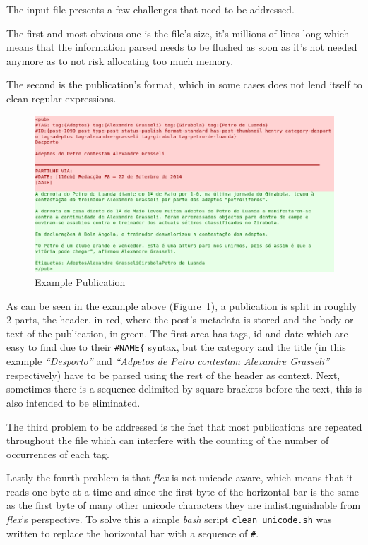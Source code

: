 \documentclass[a4paper]{article}
\begin{document}
The input file presents a few challenges that need to be addressed.

The first and most obvious one is the file's size, it's millions of lines long
which means that the information parsed needs to be flushed as soon as it's not
needed anymore as to not risk allocating too much memory.

The second is the publication's format, which in some cases does not lend
itself to clean regular expressions.

\begin{figure}[H]
    \includegraphics[width=\textwidth]{./example_pub_colored_simple.png}
    \caption{Example Publication}\label{fig:example_pub_simple}
\end{figure}

As can be seen in the example above (Figure~\ref{fig:example_pub_simple}), a
publication is split in roughly 2 parts, the header, in red, where the post's
metadata is stored and the body or text of the publication, in green. The first
area has tags, id and date which are easy to find due to their
\texttt{\#NAME\{} syntax, but the category and the title (in this example
\textit{``Desporto''} and \textit{``Adpetos de Petro contestam Alexandre
Grasseli''} respectively) have to be parsed using the rest of the header as
context. Next, sometimes there is a sequence delimited by square brackets before
the text, this is also intended to be eliminated.

The third problem to be addressed is the fact that most publications
are repeated throughout the file which can interfere with the counting of the
number of occurrences of each tag.

Lastly the fourth problem is that \textit{flex} is not unicode aware,
which means that it reads one byte at a time and since the first byte of the
horizontal bar is the same as the first byte of many other unicode characters
they are indistinguishable from \textit{flex}'s perspective. To solve this a
simple \textit{bash} script \texttt{clean\_unicode.sh} was written to replace
the horizontal bar with a sequence of \verb!#!.
\end{document}
